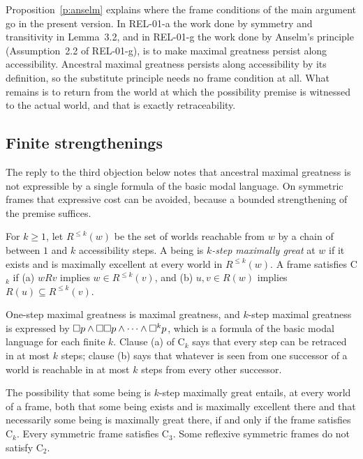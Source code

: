 \documentclass{situationist-preprint}
\begin{document}
Proposition~\ref{p:anselm} explains where the frame conditions of the main argument go in the present version. In REL-01-a the work done by symmetry and transitivity in Lemma~3.2, and in REL-01-g the work done by Anselm's principle (Assumption~2.2 of REL-01-g), is to make maximal greatness persist along accessibility. Ancestral maximal greatness persists along accessibility by its definition, so the substitute principle needs no frame condition at all. What remains is to return from the world at which the possibility premise is witnessed to the actual world, and that is exactly retraceability.

\subsection{Finite strengthenings}\label{s:finite}

The reply to the third objection below notes that ancestral maximal greatness is not expressible by a single formula of the basic modal language. On symmetric frames that expressive cost can be avoided, because a bounded strengthening of the premise suffices.

\begin{definition}\label{d:ck}
For $k \geq 1$, let $R^{\leq k}(w)$ be the set of worlds reachable from $w$ by a chain of between $1$ and $k$ accessibility steps. A being is \emph{$k$-step maximally great} at $w$ if it exists and is maximally excellent at every world in $R^{\leq k}(w)$. A frame satisfies C$_k$ if (a) $wRv$ implies $w \in R^{\leq k}(v)$, and (b) $u, v \in R(w)$ implies $R(u) \subseteq R^{\leq k}(v)$.
\end{definition}

One-step maximal greatness is maximal greatness, and $k$-step maximal greatness is expressed by $\mathord{\Box} p \wedge \mathord{\Box}\mathord{\Box} p \wedge \cdots \wedge \mathord{\Box}^k p$, which is a formula of the basic modal language for each finite $k$. Clause (a) of C$_k$ says that every step can be retraced in at most $k$ steps; clause (b) says that whatever is seen from one successor of a world is reachable in at most $k$ steps from every other successor.

\begin{proposition}\label{p:finite}
The possibility that some being is $k$-step maximally great entails, at every world of a frame, both that some being exists and is maximally excellent there and that necessarily some being is maximally great there, if and only if the frame satisfies C$_k$. Every symmetric frame satisfies C$_3$. Some reflexive symmetric frames do not satisfy C$_2$.
\end{proposition}
\end{document}
